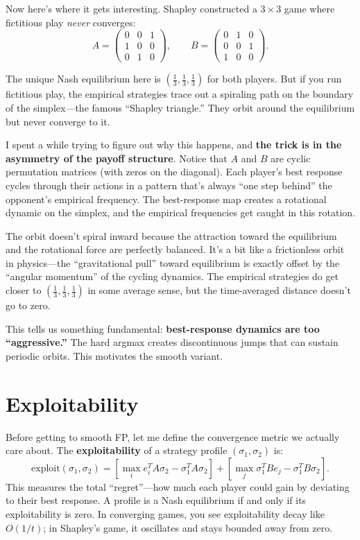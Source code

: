 \documentclass[11pt]{article}
\begin{document}
Now here's where it gets interesting. Shapley \cite{shapley1964} constructed a $3 \times 3$ game where fictitious play \emph{never} converges:
\[
A = \begin{pmatrix} 0 & 0 & 1 \\ 1 & 0 & 0 \\ 0 & 1 & 0 \end{pmatrix}, \qquad B = \begin{pmatrix} 0 & 1 & 0 \\ 0 & 0 & 1 \\ 1 & 0 & 0 \end{pmatrix}.
\]

The unique Nash equilibrium here is $(\frac{1}{3}, \frac{1}{3}, \frac{1}{3})$ for both players. But if you run fictitious play, the empirical strategies trace out a spiraling path on the boundary of the simplex---the famous ``Shapley triangle.'' They orbit around the equilibrium but never converge to it.

I spent a while trying to figure out why this happens, and \textbf{the trick is in the asymmetry of the payoff structure}. Notice that $A$ and $B$ are cyclic permutation matrices (with zeros on the diagonal). Each player's best response cycles through their actions in a pattern that's always ``one step behind'' the opponent's empirical frequency. The best-response map creates a rotational dynamic on the simplex, and the empirical frequencies get caught in this rotation.

The orbit doesn't spiral inward because the attraction toward the equilibrium and the rotational force are perfectly balanced. It's a bit like a frictionless orbit in physics---the ``gravitational pull'' toward equilibrium is exactly offset by the ``angular momentum'' of the cycling dynamics. The empirical strategies do get closer to $(\frac{1}{3}, \frac{1}{3}, \frac{1}{3})$ in some average sense, but the time-averaged distance doesn't go to zero.

This tells us something fundamental: \textbf{best-response dynamics are too ``aggressive.''} The hard argmax creates discontinuous jumps that can sustain periodic orbits. This motivates the smooth variant.

\section{Exploitability}

Before getting to smooth FP, let me define the convergence metric we actually care about. The \textbf{exploitability} of a strategy profile $(\sigma_1, \sigma_2)$ is:
\[
\text{exploit}(\sigma_1, \sigma_2) = \left[\max_i e_i^T A \sigma_2 - \sigma_1^T A \sigma_2 \right] + \left[\max_j \sigma_1^T B e_j - \sigma_1^T B \sigma_2\right].
\]
This measures the total ``regret''---how much each player could gain by deviating to their best response. A profile is a Nash equilibrium if and only if its exploitability is zero. In converging games, you see exploitability decay like $O(1/t)$; in Shapley's game, it oscillates and stays bounded away from zero.
\end{document}
